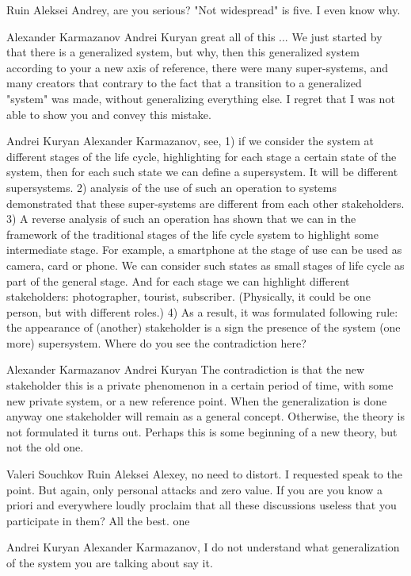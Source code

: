 \documentclass[11pt,a4paper]{article}
\begin{document}
Ruin Aleksei Andrey, are you serious? "Not widespread" is five. I even know
why.

Alexander Karmazanov Andrei Kuryan great all of this ... We just started by
that there is a generalized system, but why, then this generalized system
according to your a new axis of reference, there were many super-systems, and
many creators that contrary to the fact that a transition to a generalized
"system" was made, without generalizing everything else. I regret that I was
not able to show you and convey this mistake.

Andrei Kuryan Alexander Karmazanov, see, 1) if we consider the system at
different stages of the life cycle, highlighting for each stage a certain
state of the system, then for each such state we can define a supersystem. It
will be different supersystems. 2) analysis of the use of such an operation to
systems demonstrated that these super-systems are different from each other
stakeholders. 3) A reverse analysis of such an operation has shown that we can
in the framework of the traditional stages of the life cycle system to
highlight some intermediate stage. For example, a smartphone at the stage of
use can be used as camera, card or phone. We can consider such states as small
stages of life cycle as part of the general stage. And for each stage we can
highlight different stakeholders: photographer, tourist,
subscriber. (Physically, it could be one person, but with different roles.) 4)
As a result, it was formulated following rule: the appearance of (another)
stakeholder is a sign the presence of the system (one more) supersystem. Where
do you see the contradiction here?

Alexander Karmazanov Andrei Kuryan The contradiction is that the new
stakeholder this is a private phenomenon in a certain period of time, with
some new private system, or a new reference point. When the generalization is
done anyway one stakeholder will remain as a general concept. Otherwise, the
theory is not formulated it turns out. Perhaps this is some beginning of a new
theory, but not the old one.

Valeri Souchkov Ruin Aleksei Alexey, no need to distort. I requested speak to
the point. But again, only personal attacks and zero value. If you are you
know a priori and everywhere loudly proclaim that all these discussions
useless that you participate in them? All the best. one

Andrei Kuryan Alexander Karmazanov, I do not understand what generalization of
the system you are talking about say it.
\end{document}

